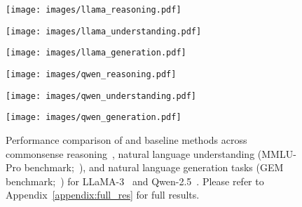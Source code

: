 \begin{figure*}[!th]
\centering
\begin{minipage}{0.32\textwidth}
    \texttt{[image: images/llama\_reasoning.pdf]}
\end{minipage}
\hfill
\begin{minipage}{0.32\textwidth}
    \texttt{[image: images/llama\_understanding.pdf]}
\end{minipage}
\hfill
\begin{minipage}{0.32\textwidth}
    \texttt{[image: images/llama\_generation.pdf]}
\end{minipage}

\medskip

\begin{minipage}{0.32\textwidth}
    \texttt{[image: images/qwen\_reasoning.pdf]}
\end{minipage}
\hfill
\begin{minipage}{0.32\textwidth}
    \texttt{[image: images/qwen\_understanding.pdf]}
\end{minipage}
\hfill
\begin{minipage}{0.32\textwidth}
    \texttt{[image: images/qwen\_generation.pdf]}
\end{minipage}
\caption{\label{fig:main_res}
Performance comparison of \jola{} and baseline methods across commonsense reasoning~\cite{hu-etal-2023-llm}, natural language understanding (MMLU-Pro benchmark;~\citealp{wang2024mmlu}), and natural language generation tasks (GEM benchmark;~\citealp{gehrmann-etal-2022-gemv2}) for LLaMA-3~\cite{dubey2024llama} and Qwen-2.5~\cite{yang2024qwen2}. Please refer to Appendix~\ref{appendix:full_res} for full results.
}
\end{figure*}